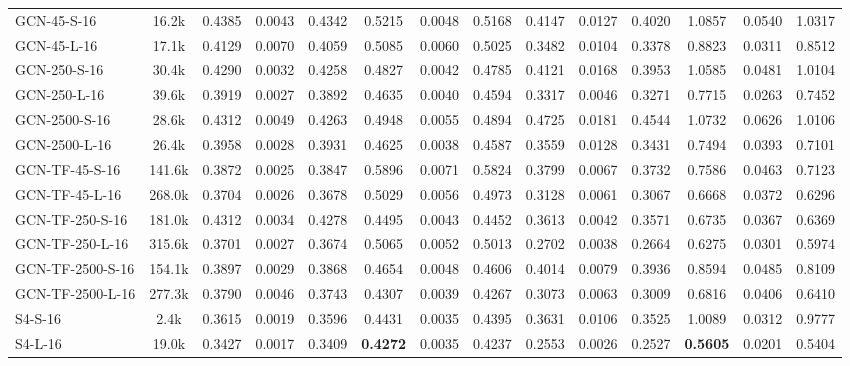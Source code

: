 \begin{table*}[h]
{\begin{tabular}{l c >{\columncolor{gray!20}}ccc >{\columncolor{gray!20}}ccc >{\columncolor{gray!20}}ccc >{\columncolor{gray!20}}ccc}
            \hline
            GCN-45-S-16 & 16.2k & 0.4385 & 0.0043 & 0.4342 & 0.5215 & 0.0048 & 0.5168 & 0.4147 & 0.0127 & 0.4020 & 1.0857 & 0.0540 & 1.0317 \\ 
            GCN-45-L-16 & 17.1k & 0.4129 & 0.0070 & 0.4059 & 0.5085 & 0.0060 & 0.5025 & 0.3482 & 0.0104 & 0.3378 & 0.8823 & 0.0311 & 0.8512 \\
            GCN-250-S-16 & 30.4k & 0.4290 & 0.0032 & 0.4258 & 0.4827 & 0.0042 & 0.4785 & 0.4121 & 0.0168 & 0.3953 & 1.0585 & 0.0481 & 1.0104 \\ 
            GCN-250-L-16 & 39.6k & 0.3919 & 0.0027 & 0.3892 & 0.4635 & 0.0040 & 0.4594 & 0.3317 & 0.0046 & 0.3271 & 0.7715 & 0.0263 & 0.7452 \\
            GCN-2500-S-16 & 28.6k & 0.4312 & 0.0049 & 0.4263 & 0.4948 & 0.0055 & 0.4894 & 0.4725 & 0.0181 & 0.4544 & 1.0732 & 0.0626 & 1.0106 \\ 
            GCN-2500-L-16 & 26.4k & 0.3958 & 0.0028 & 0.3931 & 0.4625 & 0.0038 & 0.4587 & 0.3559 & 0.0128 & 0.3431 & 0.7494 & 0.0393 & 0.7101 \\
            \hline
            GCN-TF-45-S-16 & 141.6k & 0.3872 & 0.0025 & 0.3847 & 0.5896 & 0.0071 & 0.5824 & 0.3799 & 0.0067 & 0.3732 & 0.7586 & 0.0463 & 0.7123 \\
            GCN-TF-45-L-16 & 268.0k & 0.3704 & 0.0026 & 0.3678 & 0.5029 & 0.0056 & 0.4973 & 0.3128 & 0.0061 & 0.3067 & 0.6668 & 0.0372 & 0.6296 \\
            GCN-TF-250-S-16 & 181.0k & 0.4312 & 0.0034 & 0.4278 & 0.4495 & 0.0043 & 0.4452 & 0.3613 & 0.0042 & 0.3571 & 0.6735 & 0.0367 & 0.6369 \\
            GCN-TF-250-L-16 & 315.6k & 0.3701 & 0.0027 & 0.3674 & 0.5065 & 0.0052 & 0.5013 & 0.2702 & 0.0038 & 0.2664 & 0.6275 & 0.0301 & 0.5974 \\
            GCN-TF-2500-S-16 & 154.1k & 0.3897 & 0.0029 & 0.3868 & 0.4654 & 0.0048 & 0.4606 & 0.4014 & 0.0079 & 0.3936 & 0.8594 & 0.0485 & 0.8109 \\
            GCN-TF-2500-L-16 & 277.3k & 0.3790 & 0.0046 & 0.3743 & 0.4307 & 0.0039 & 0.4267 & 0.3073 & 0.0063 & 0.3009 & 0.6816 & 0.0406 & 0.6410 \\
            \hline
            S4-S-16 & 2.4k & 0.3615 & 0.0019 & 0.3596 & 0.4431 & 0.0035 & 0.4395 & 0.3631 & 0.0106 & 0.3525 & 1.0089 & 0.0312 & 0.9777 \\
            S4-L-16 & 19.0k & 0.3427 & 0.0017 & 0.3409 & \textbf{0.4272} & 0.0035 & 0.4237 & 0.2553 & 0.0026 & 0.2527 & \textbf{0.5605} & 0.0201 & 0.5404 \\

\end{tabular}}
\end{table*}
